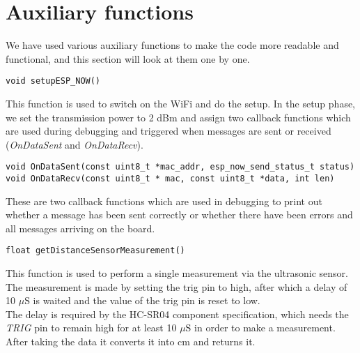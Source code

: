 \section{Auxiliary functions}
We have used various auxiliary functions to make the code more readable and functional, and this section will look at them one by one. \\
\begin{verbatim}
void setupESP_NOW()
\end{verbatim}
This function is used to switch on the WiFi and do the setup.
In the setup phase, we set the transmission power to 2 dBm and assign two callback functions which are used during debugging and triggered when messages are sent or received (\textit{OnDataSent} and \textit{OnDataRecv}). \\
\begin{verbatim}
void OnDataSent(const uint8_t *mac_addr, esp_now_send_status_t status)
void OnDataRecv(const uint8_t * mac, const uint8_t *data, int len) 
\end{verbatim}
These are two callback functions which are used in debugging to print out whether a message has been sent correctly or whether there have been errors and all messages arriving on the board. \\
\begin{verbatim}
float getDistanceSensorMeasurement()
\end{verbatim}
This function is used to perform a single measurement via the ultrasonic sensor.
The measurement is made by setting the trig pin to high, after which a delay of 10 $\mu\text{S}$ is waited and the value of the trig pin is reset to low. \\
The delay is required by the HC-SR04 component specification, which needs the \textit{TRIG} pin to remain high for at least 10 $\mu\text{S}$ in order to make a measurement. After taking the data it converts it into cm and returns it.

